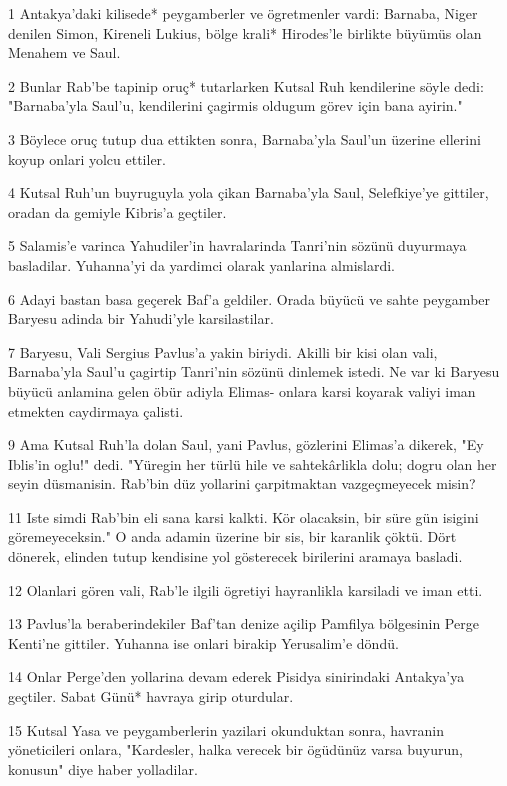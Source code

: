 \par 1 Antakya'daki kilisede* peygamberler ve ögretmenler vardi: Barnaba, Niger denilen Simon, Kireneli Lukius, bölge krali* Hirodes'le birlikte büyümüs olan Menahem ve Saul.
\par 2 Bunlar Rab'be tapinip oruç* tutarlarken Kutsal Ruh kendilerine söyle dedi: "Barnaba'yla Saul'u, kendilerini çagirmis oldugum görev için bana ayirin."
\par 3 Böylece oruç tutup dua ettikten sonra, Barnaba'yla Saul'un üzerine ellerini koyup onlari yolcu ettiler.
\par 4 Kutsal Ruh'un buyruguyla yola çikan Barnaba'yla Saul, Selefkiye'ye gittiler, oradan da gemiyle Kibris'a geçtiler.
\par 5 Salamis'e varinca Yahudiler'in havralarinda Tanri'nin sözünü duyurmaya basladilar. Yuhanna'yi da yardimci olarak yanlarina almislardi.
\par 6 Adayi bastan basa geçerek Baf'a geldiler. Orada büyücü ve sahte peygamber Baryesu adinda bir Yahudi'yle karsilastilar.
\par 7 Baryesu, Vali Sergius Pavlus'a yakin biriydi. Akilli bir kisi olan vali, Barnaba'yla Saul'u çagirtip Tanri'nin sözünü dinlemek istedi. Ne var ki Baryesu büyücü anlamina gelen öbür adiyla Elimas- onlara karsi koyarak valiyi iman etmekten caydirmaya çalisti.
\par 9 Ama Kutsal Ruh'la dolan Saul, yani Pavlus, gözlerini Elimas'a dikerek, "Ey Iblis'in oglu!" dedi. "Yüregin her türlü hile ve sahtekârlikla dolu; dogru olan her seyin düsmanisin. Rab'bin düz yollarini çarpitmaktan vazgeçmeyecek misin?
\par 11 Iste simdi Rab'bin eli sana karsi kalkti. Kör olacaksin, bir süre gün isigini göremeyeceksin." O anda adamin üzerine bir sis, bir karanlik çöktü. Dört dönerek, elinden tutup kendisine yol gösterecek birilerini aramaya basladi.
\par 12 Olanlari gören vali, Rab'le ilgili ögretiyi hayranlikla karsiladi ve iman etti.
\par 13 Pavlus'la beraberindekiler Baf'tan denize açilip Pamfilya bölgesinin Perge Kenti'ne gittiler. Yuhanna ise onlari birakip Yerusalim'e döndü.
\par 14 Onlar Perge'den yollarina devam ederek Pisidya sinirindaki Antakya'ya geçtiler. Sabat Günü* havraya girip oturdular.
\par 15 Kutsal Yasa ve peygamberlerin yazilari okunduktan sonra, havranin yöneticileri onlara, "Kardesler, halka verecek bir ögüdünüz varsa buyurun, konusun" diye haber yolladilar.
